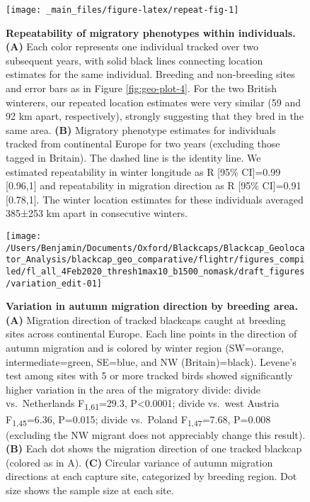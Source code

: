 \documentclass[a4paper, nobind]{templates/ociamthesis}
\begin{document}
\begin{figure}
\texttt{[image: \_main\_files/figure-latex/repeat-fig-1]} \caption{\textbf{Repeatability of migratory phenotypes within individuals.} \textbf{(A)} Each color represents one individual tracked over two subsequent years, with solid black lines connecting location estimates for the same individual. Breeding and non-breeding sites and error bars as in Figure \ref{fig:geo-plot-4}. For the two British winterers, our repeated location estimates were very similar (59 and 92 km apart, respectively), strongly suggesting that they bred in the same area. \textbf{(B)} Migratory phenotype estimates for individuals tracked from continental Europe for two years (excluding those tagged in Britain). The dashed line is the identity line. We estimated repeatability in winter longitude as R {[}95\% CI{]}=0.99 {[}0.96,1{]} and repeatability in migration direction as R {[}95\% CI{]}=0.91 {[}0.78,1{]}. The winter location estimates for these individuals averaged 385±253 km apart in consecutive winters.}\label{fig:repeat-fig}
\end{figure}



\begin{figure}
\texttt{[image: /Users/Benjamin/Documents/Oxford/Blackcaps/Blackcap\_Geolocator\_Analysis/blackcap\_geo\_comparative/flightr/figures\_compiled/fl\_all\_4Feb2020\_thresh1max10\_b1500\_nomask/draft\_figures/variation\_edit-01]} \caption{\textbf{Variation in autumn migration direction by breeding area.} \textbf{(A)} Migration direction of tracked blackcaps caught at breeding sites across continental Europe. Each line points in the direction of autumn migration and is colored by winter region (SW=orange, intermediate=green, SE=blue, and NW (Britain)=black). Levene's test among sites with 5 or more tracked birds showed significantly higher variation in the area of the migratory divide: divide vs.~Netherlands F\textsubscript{1,61}=29.3, P\textless0.0001; divide vs.~west Austria F\textsubscript{1,45}=6.36, P=0.015; divide vs.~Poland F\textsubscript{1,47}=7.68, P=0.008 (excluding the NW migrant does not appreciably change this result). \textbf{(B)} Each dot shows the migration direction of one tracked blackcap (colored as in A). \textbf{(C)} Circular variance of autumn migration directions at each capture site, categorized by breeding region. Dot size shows the sample size at each site.}\label{fig:var-fig-edit}
\end{figure}
\end{document}
